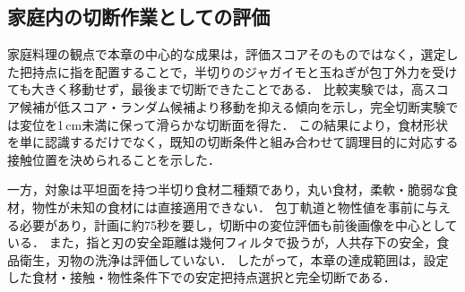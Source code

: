 \begin{revisionblock}
\subsection{家庭内の切断作業としての評価}
家庭料理の観点で本章の中心的な成果は，評価スコアそのものではなく，選定した把持点に指を配置することで，半切りのジャガイモと玉ねぎが包丁外力を受けても大きく移動せず，最後まで切断できたことである．
比較実験では，高スコア候補が低スコア・ランダム候補より移動を抑える傾向を示し，完全切断実験では変位を1\,cm未満に保って滑らかな切断面を得た．
この結果により，食材形状を単に認識するだけでなく，既知の切断条件と組み合わせて調理目的に対応する接触位置を決められることを示した．

一方，対象は平坦面を持つ半切り食材二種類であり，丸い食材，柔軟・脆弱な食材，物性が未知の食材には直接適用できない．
包丁軌道と物性値を事前に与える必要があり，計画に約75秒を要し，切断中の変位評価も前後画像を中心としている．
また，指と刃の安全距離は幾何フィルタで扱うが，人共存下の安全，食品衛生，刃物の洗浄は評価していない．
したがって，本章の達成範囲は，設定した食材・接触・物性条件下での安定把持点選択と完全切断である．
\end{revisionblock}









